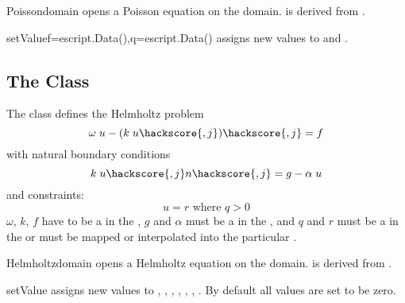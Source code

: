 \begin{classdesc}{Poisson}{domain}
opens a Poisson equation on the \Domain domain. \Poisson is derived from \LinearPDE.
\end{classdesc}
\begin{methoddesc}[Poisson]{setValue}{f=escript.Data(),q=escript.Data()}
assigns new values to  and .
\end{methoddesc}

\subsection{The \Helmholtz Class}
The \Helmholtz class defines the Helmholtz problem
\begin{equation}\label{HZ.1}
\omega \; u - (k\; u\hackscore{,j})\hackscore{,j} = f
\end{equation}
 with natural boundary conditions
\begin{equation}\label{HZ.2}
k\; u\hackscore{,j} n\hackscore{,j} = g- \alpha \; u 
\end{equation}
and constraints:
\begin{equation}\label{HZ.3}
u=r \mbox{ where } q>0
\end{equation}
$\omega$, $k$, $f$ have to be a \Scalar in the \Function,
$g$ and $\alpha$ must be a \Scalar in  the \FunctionOnBoundary,
and $q$ and $r$ must be a \Scalar in  the \SolutionFS or must be mapped or interpolated into the particular \FunctionSpace.

\begin{classdesc}{Helmholtz}{domain}
opens a Helmholtz equation on the \Domain domain. \Helmholtz is derived from \LinearPDE.
\end{classdesc}
\begin{methoddesc}[Helmholtz]{setValue}{       }
assigns new values to , , , , , , . By default all values are set to be zero.
\end{methoddesc}

